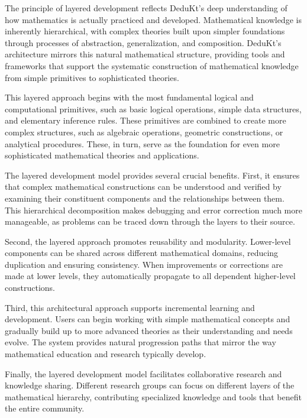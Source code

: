 The principle of layered development reflects DeduKt's deep understanding of how mathematics is actually practiced and developed.
Mathematical knowledge is inherently hierarchical, with complex theories built upon simpler foundations through processes of abstraction, generalization, and composition.
DeduKt's architecture mirrors this natural mathematical structure, providing tools and frameworks that support the systematic construction of mathematical knowledge from simple primitives to sophisticated theories.

This layered approach begins with the most fundamental logical and computational primitives, such as basic logical operations, simple data structures, and elementary inference rules.
These primitives are combined to create more complex structures, such as algebraic operations, geometric constructions, or analytical procedures.
These, in turn, serve as the foundation for even more sophisticated mathematical theories and applications.

The layered development model provides several crucial benefits.
First, it ensures that complex mathematical constructions can be understood and verified by examining their constituent components and the relationships between them.
This hierarchical decomposition makes debugging and error correction much more manageable, as problems can be traced down through the layers to their source.

Second, the layered approach promotes reusability and modularity.
Lower-level components can be shared across different mathematical domains, reducing duplication and ensuring consistency.
When improvements or corrections are made at lower levels, they automatically propagate to all dependent higher-level constructions.

Third, this architectural approach supports incremental learning and development.
Users can begin working with simple mathematical concepts and gradually build up to more advanced theories as their understanding and needs evolve.
The system provides natural progression paths that mirror the way mathematical education and research typically develop.

Finally, the layered development model facilitates collaborative research and knowledge sharing.
Different research groups can focus on different layers of the mathematical hierarchy, contributing specialized knowledge and tools that benefit the entire community.